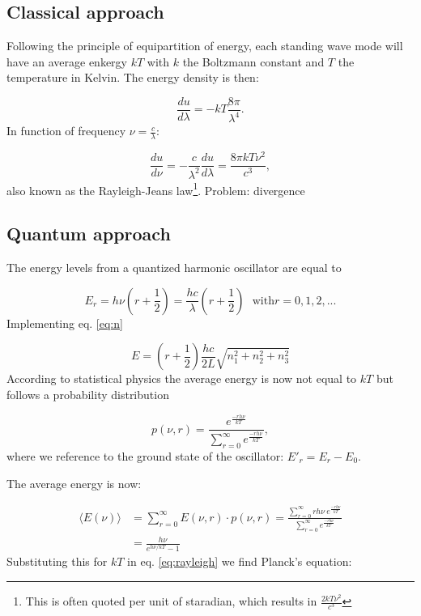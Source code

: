 \begin{appendices}
\subsection{Classical approach}
Following the principle of equipartition of energy, each standing wave mode will have an average enkergy $kT$ with $k$ the Boltzmann constant and $T$ the temperature in Kelvin. The energy density is then:

\begin{equation}
\frac{du}{d\lambda} = -kT \frac{8\pi}{\lambda^4}.
\end{equation}
In function of frequency $\nu = \frac{c}{\lambda}$:

\begin{equation}
\label{eq:rayleigh}
\frac{du}{d\nu} = -\frac{c}{\lambda^2} \frac{du}{d\lambda} = \frac{8\pi kT \nu^2}{c^3},
\end{equation}
also known as the Rayleigh-Jeans law\footnote{This is often quoted per unit of staradian, which results in $\frac{2 kT \nu^2}{c^3}$}. Problem: divergence

\subsection{Quantum approach}
The energy levels from a quantized harmonic oscillator are equal to

\begin{equation}
E_r = h\nu\left(r+\frac{1}{2}\right) = \frac{hc}{\lambda}\left(r+\frac{1}{2}\right) \ \ \ \textrm{with} r = 0,1,2,...
\end{equation}
Implementing eq. \ref{eq:n}

\begin{equation}
E = \left(r+\frac{1}{2}\right) \frac{hc}{2L}\sqrt{n_1^2 + n_2^2 + n_3^2}
\end{equation}
According to statistical physics the average energy is now not equal to $kT$ but follows a probability distribution

\begin{equation}
p(\nu,r) = \frac{e^{\frac{-rh\nu}{kT}}}{\sum_{r=0}^\infty e^{\frac{-rh\nu}{kT}}},
\end{equation}
where we reference to the ground state of the oscillator: $E'_r = E_r - E_0$.

The average energy is now:

\begin{equation}
\begin{split}
\langle E(\nu)\rangle &= \sum_{r=0}^\infty E(\nu,r) \cdot p(\nu,r) = \frac{\sum_{r=0}^\infty r h \nu \  e^{\frac{-rh\nu}{kT}}}{\sum_{r=0}^\infty e^{\frac{-rh\nu}{kT}}}\\
&= \frac{h\nu}{e^{h\nu/kT} - 1}
\end{split}
\end{equation}
Substituting this for $kT$ in eq. \ref{eq:rayleigh} we find Planck's equation:


\end{appendices}
